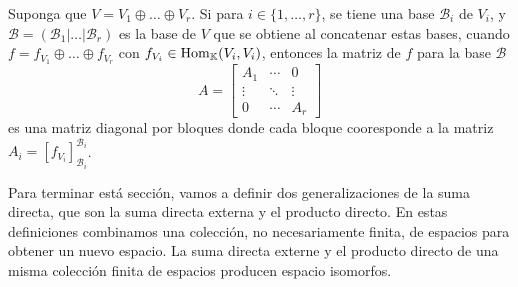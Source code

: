 \begin{obs}\label{diagonalbloques}
  Suponga que $V=V_1\oplus\ldots\oplus V_r$. Si para $i\in\{1,\ldots,r\}$, se tiene una base $\mathcal{B}_i$ de $V_i$, y $\mathcal{B}=\left(\mathcal{B}_1|\ldots|\mathcal{B}_r\right)$ es la base de $V$ que se obtiene al concatenar estas bases, cuando $f=f_{V_1}\oplus\ldots\oplus f_{V_r}$ con $f_{V_i}\in\operatorname{Hom}_\mathbb{K}(V_i,V_i)$, entonces la matriz de $f$ para la base $\mathcal{B}$
  $$A=\left[\begin{array}{c|c|c}
    A_1 & \cdots & 0\\
    \hline
    \vdots & \ddots & \vdots\\
    \hline
    0 & \cdots & A_r
  \end{array}\right]$$
es una matriz diagonal por bloques donde cada bloque cooresponde a la matriz $A_i=\left[f_{V_i}\right]_{\mathcal{B}_i}^{\mathcal{B}_i}$.
\end{obs}

\begin{obs}
Para terminar est\'a secci\'on, vamos a definir dos generalizaciones de la suma directa, que son la suma directa externa y el producto directo. En estas definiciones combinamos una colecci\'on, no necesariamente finita, de espacios para obtener un nuevo espacio. La suma directa externe y el producto directo de una misma colecci\'on finita de espacios producen espacio isomorfos.
\end{obs}

